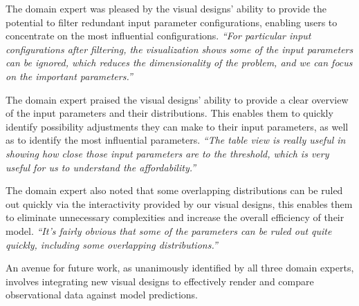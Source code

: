 
The domain expert was pleased by the visual designs' ability to provide the potential to filter redundant input parameter configurations, enabling users to concentrate on the most influential configurations.
\textit{``For particular input configurations after filtering, the visualization shows some of the input parameters can be ignored, which reduces the dimensionality of the problem, and we can focus on the important parameters.''
}

The domain expert praised the visual designs' ability to provide a clear overview of the input parameters and their distributions. This enables them to quickly identify possibility adjustments they can make to their input parameters, as well as to identify the most influential parameters.
\textit{
``The table view is really useful in showing how close those input parameters are to the threshold, which is very useful for us to understand the affordability.''
}

The domain expert also noted that some overlapping distributions can be ruled out quickly via the interactivity provided by our visual designs, this enables them to eliminate unnecessary complexities and increase the overall efficiency of their model.
\textit{
``It's fairly obvious that some of the parameters can be ruled out quite quickly, including some overlapping distributions.''
}

An avenue for future work, as unanimously identified by all three domain experts, involves integrating new visual designs to effectively render and compare observational data against model predictions.
